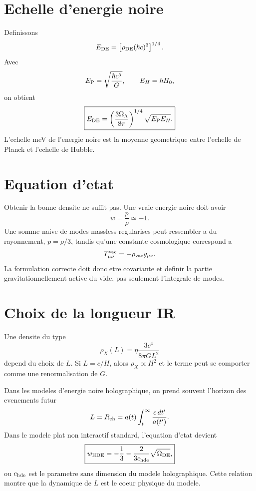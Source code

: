 \documentclass[11pt,a4paper]{article}
\newcommand{\rhoDE}{\rho_{\rm DE}}
\newcommand{\EP}{E_{\rm P}}
\newcommand{\EH}{E_H}
\newcommand{\EDE}{E_{\rm DE}}
\begin{document}
\section{Echelle d'energie noire}

Definissons
\begin{equation}
\EDE=\left[\rhoDE(\hbar c)^3\right]^{1/4}.
\end{equation}
Avec
\begin{equation}
\EP=\sqrt{\frac{\hbar c^5}{G}},
\qquad
\EH=\hbar H_0,
\end{equation}
on obtient
\begin{equation}
\boxed{
\EDE=
\left(\frac{3\Omega_\Lambda}{8\pi}\right)^{1/4}
\sqrt{\EP\EH}.
}
\label{eq:e_de}
\end{equation}
L'echelle meV de l'energie noire est la moyenne geometrique entre l'echelle de
Planck et l'echelle de Hubble.

\section{Equation d'etat}

Obtenir la bonne densite ne suffit pas. Une vraie energie noire doit avoir
\begin{equation}
w=\frac{p}{\rho}\simeq-1.
\end{equation}
Une somme naive de modes massless regularises peut ressembler a du rayonnement,
$p=\rho/3$, tandis qu'une constante cosmologique correspond a
\begin{equation}
T_{\mu\nu}^{\rm vac}=-\rho_{\rm vac}g_{\mu\nu}.
\end{equation}
La formulation correcte doit donc etre covariante et definir la partie
gravitationnellement active du vide, pas seulement l'integrale de modes.

\section{Choix de la longueur IR}

Une densite du type
\begin{equation}
\rho_X(L)=\eta\frac{3c^4}{8\pi GL^2}
\end{equation}
depend du choix de $L$. Si $L=c/H$, alors $\rho_X\propto H^2$ et le terme peut
se comporter comme une renormalisation de $G$.

Dans les modeles d'energie noire holographique, on prend souvent l'horizon des
evenements futur
\begin{equation}
L=R_{\rm eh}=a(t)\int_t^\infty\frac{c\,dt'}{a(t')}.
\end{equation}
Dans le modele plat non interactif standard, l'equation d'etat devient
\begin{equation}
\boxed{
w_{\rm HDE}
=
-\frac13-\frac{2}{3c_{\rm hde}}\sqrt{\Omega_{\rm DE}},
}
\label{eq:w_hde}
\end{equation}
ou $c_{\rm hde}$ est le parametre sans dimension du modele holographique. Cette
relation montre que la dynamique de $L$ est le coeur physique du modele.
\end{document}
